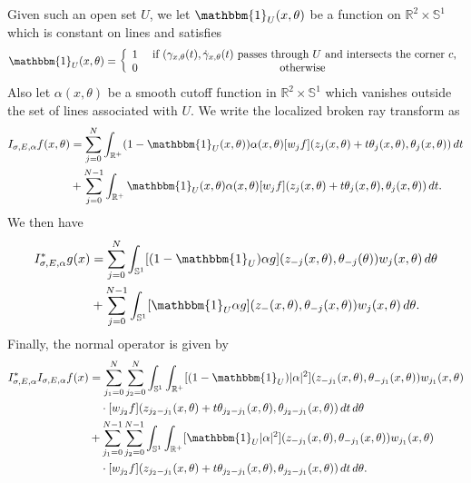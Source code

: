 \documentclass[10pt]{amsart}
\theoremstyle{definition}
\theoremstyle{definition}
\theoremstyle{definition}
\newcommand{ \rn }[1]{\mathbb{R}^{#1}}
\begin{document}
Given such an open set $U$, we let $\mathbbm{1}_{U}(x,\theta)$ be a function on $\rn{2} \times \mathbb{S}^{1}$ which is constant on lines and satisfies
\begin{equation}
\mathbbm{1}_{U}(x,\theta) = \left\{ \begin{array}{cc}
1 & \textrm{ if $(\gamma_{x,\theta}(t), \dot{\gamma}_{x,\theta}(t)$ passes through $U$ and intersects the corner $c$,}\\
0 & \textrm{ otherwise }
\end{array}\right.
\end{equation}
Also let $\alpha(x,\theta)$ be a smooth cutoff function in $\rn{2} \times \mathbb{S}^{1}$ which vanishes outside the set of lines associated with $U$. We write the localized broken ray transform as
\begin{align}
I_{\sigma, E, \alpha}f(x,\theta) & = \sum_{j=0}^{N} \int_{\rn{+}}(1- \mathbbm{1}_{U}(x,\theta))\alpha(x,\theta)[w_{j}f](z_{j}(x,\theta) + t\theta_{j}(x,\theta), \theta_{j}(x,\theta))\,dt \notag\\
& + \sum_{j=0}^{N-1} \int_{\rn{+}}\mathbbm{1}_{U}(x,\theta)\alpha(x,\theta)[w_{j}f](z_{j}(x,\theta) + t\theta_{j}(x,\theta), \theta_{j}(x,\theta))\,dt.
\end{align}
We then have
\begin{align}
I_{\sigma, E, \alpha}^{*}g(x) & = \sum_{j=0}^{N} \int_{\mathbb{S}^{1}}[(1- \mathbbm{1}_{U})\alpha g](z_{-j}(x,\theta), \theta_{-j}(\theta))w_{j}(x,\theta)\,d\theta \notag\\
& + \sum_{j=0}^{N-1} \int_{\mathbb{S}^{1}}[\mathbbm{1}_{U}\alpha g](z_{-}(x,\theta), \theta_{-j}(x,\theta))w_{j}(x,\theta)\,d\theta.
\end{align}
Finally, the normal operator is given by
\begin{align}
I_{\sigma, E, \alpha}^{*}I_{\sigma, E, \alpha}f(x) & = \sum_{j_{1}=0}^{N}\sum_{j_{2}=0}^{N}\int_{\mathbb{S}^{1}}\int_{\rn{+}}[(1-\mathbbm{1}_{U})|\alpha|^{2}](z_{-j_{1}}(x,\theta),\theta_{-j_{1}}(x,\theta))w_{j_{1}}(x,\theta) \notag\\
& \quad \cdot [w_{j_{2}}f](z_{j_{2}-j_{1}}(x,\theta) + t\theta_{j_{2}-j_{1}}(x,\theta), \theta_{j_{2}-j_{1}}(x,\theta))\, dt \,d\theta \notag\\
& +  \sum_{j_{1}=0}^{N-1}\sum_{j_{2}=0}^{N-1}\int_{\mathbb{S}^{1}}\int_{\rn{+}}[\mathbbm{1}_{U}|\alpha|^{2}](z_{-j_{1}}(x,\theta),\theta_{-j_{1}}(x,\theta))w_{j_{1}}(x,\theta) \notag\\
& \quad \cdot [w_{j_{2}}f](z_{j_{2}-j_{1}}(x,\theta) + t\theta_{j_{2}-j_{1}}(x,\theta), \theta_{j_{2}-j_{1}}(x,\theta))\, dt \,d\theta.
\end{align}
\end{document}
